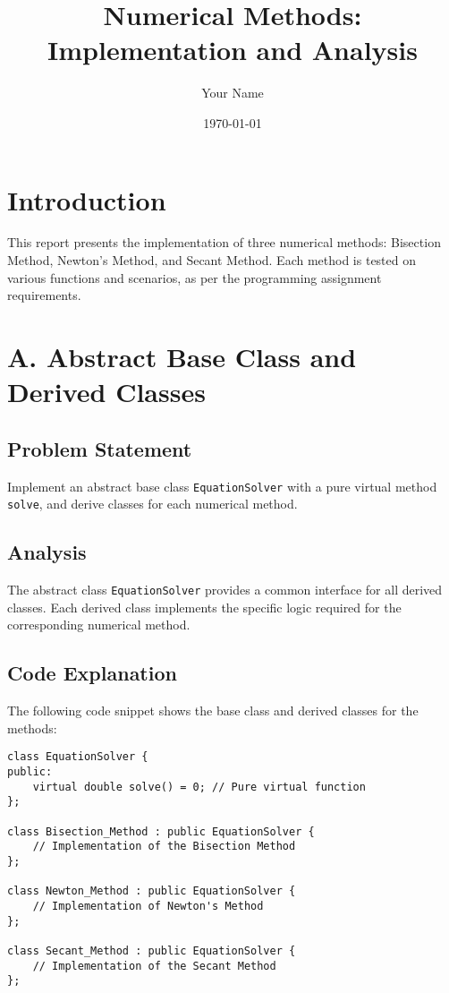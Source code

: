 \documentclass{article}
\title{Numerical Methods: Implementation and Analysis}
\author{Your Name}
\date{\today}
\begin{document}
\maketitle

\section{Introduction}
This report presents the implementation of three numerical methods: Bisection Method, Newton's Method, and Secant Method. Each method is tested on various functions and scenarios, as per the programming assignment requirements.

\section{A. Abstract Base Class and Derived Classes}
\subsection{Problem Statement}
Implement an abstract base class \texttt{EquationSolver} with a pure virtual method \texttt{solve}, and derive classes for each numerical method.

\subsection{Analysis}
The abstract class \texttt{EquationSolver} provides a common interface for all derived classes. Each derived class implements the specific logic required for the corresponding numerical method.

\subsection{Code Explanation}
The following code snippet shows the base class and derived classes for the methods:

\begin{verbatim}
class EquationSolver {
public:
    virtual double solve() = 0; // Pure virtual function
};

class Bisection_Method : public EquationSolver {
    // Implementation of the Bisection Method
};

class Newton_Method : public EquationSolver {
    // Implementation of Newton's Method
};

class Secant_Method : public EquationSolver {
    // Implementation of the Secant Method
};
\end{verbatim}
\end{document}
